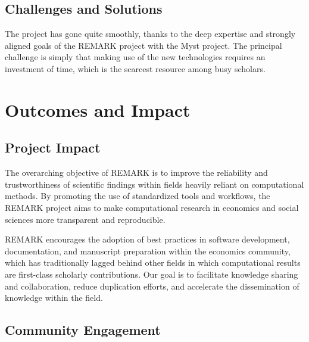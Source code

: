 \documentclass{article}
\begin{document}
\subsection{Challenges and Solutions}


The project has gone quite smoothly, thanks to the deep expertise and strongly aligned goals of the REMARK project with the Myst project. The principal challenge is simply that making use of the new technologies requires an investment of time, which is the scarcest resource among busy scholars.

\section{Outcomes and Impact}

\subsection{Project Impact}


The overarching objective of REMARK is to improve the reliability and trustworthiness of scientific findings within fields heavily reliant on computational methods. By promoting the use of standardized tools and workflows, the REMARK project aims to make computational research in economics and social sciences more transparent and reproducible.

REMARK encourages the adoption of best practices in software development, documentation, and manuscript preparation within the economics community, which has traditionally lagged behind other fields in which computational results are first-class scholarly contributions. Our goal is to facilitate knowledge sharing and collaboration, reduce duplication efforts, and accelerate the dissemination of knowledge within the field.

\subsection{Community Engagement}

\end{document}
